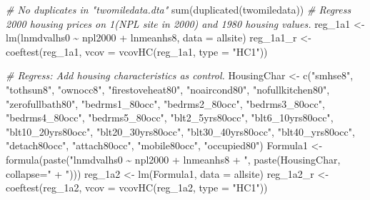 \documentclass[
]{article}
\newenvironment{Shaded}{\begin{snugshade}}{\end{snugshade}}
\newcommand{\AttributeTok}[1]{\textcolor[rgb]{0.77,0.63,0.00}{#1}}
\newcommand{\CommentTok}[1]{\textcolor[rgb]{0.56,0.35,0.01}{\textit{#1}}}
\newcommand{\FunctionTok}[1]{\textcolor[rgb]{0.00,0.00,0.00}{#1}}
\newcommand{\NormalTok}[1]{#1}
\newcommand{\OtherTok}[1]{\textcolor[rgb]{0.56,0.35,0.01}{#1}}
\newcommand{\SpecialCharTok}[1]{\textcolor[rgb]{0.00,0.00,0.00}{#1}}
\newcommand{\StringTok}[1]{\textcolor[rgb]{0.31,0.60,0.02}{#1}}
\begin{document}
\begin{Shaded}
\begin{Highlighting}[]
\CommentTok{\# No duplicates in "twomiledata.dta"}
\FunctionTok{sum}\NormalTok{(}\FunctionTok{duplicated}\NormalTok{(twomiledata))}
\CommentTok{\# Regress 2000 housing prices on 1(NPL site in 2000) and 1980 housing values.}
\NormalTok{reg\_1a1 }\OtherTok{\textless{}{-}} \FunctionTok{lm}\NormalTok{(lnmdvalhs0 }\SpecialCharTok{\textasciitilde{}}\NormalTok{ npl2000 }\SpecialCharTok{+}\NormalTok{ lnmeanhs8, }\AttributeTok{data =}\NormalTok{ allsite)}
\NormalTok{reg\_1a1\_r }\OtherTok{\textless{}{-}} \FunctionTok{coeftest}\NormalTok{(reg\_1a1, }\AttributeTok{vcov =} \FunctionTok{vcovHC}\NormalTok{(reg\_1a1, }\AttributeTok{type =} \StringTok{"HC1"}\NormalTok{))}

\CommentTok{\# Regress: Add housing characteristics as control.}
\NormalTok{HousingChar }\OtherTok{\textless{}{-}} \FunctionTok{c}\NormalTok{(}\StringTok{"smhse8"}\NormalTok{, }\StringTok{"tothsun8"}\NormalTok{, }\StringTok{"ownocc8"}\NormalTok{, }\StringTok{"firestoveheat80"}\NormalTok{, }\StringTok{"noaircond80"}\NormalTok{, }
                 \StringTok{"nofullkitchen80"}\NormalTok{, }\StringTok{"zerofullbath80"}\NormalTok{, }
                \StringTok{"bedrms1\_80occ"}\NormalTok{, }\StringTok{"bedrms2\_80occ"}\NormalTok{, }\StringTok{"bedrms3\_80occ"}\NormalTok{, }\StringTok{"bedrms4\_80occ"}\NormalTok{, }\StringTok{"bedrms5\_80occ"}\NormalTok{,}
                \StringTok{"blt2\_5yrs80occ"}\NormalTok{, }\StringTok{"blt6\_10yrs80occ"}\NormalTok{, }\StringTok{"blt10\_20yrs80occ"}\NormalTok{, }\StringTok{"blt20\_30yrs80occ"}\NormalTok{, }\StringTok{"blt30\_40yrs80occ"}\NormalTok{, }\StringTok{"blt40\_yrs80occ"}\NormalTok{,}
                \StringTok{"detach80occ"}\NormalTok{, }\StringTok{"attach80occ"}\NormalTok{, }\StringTok{"mobile80occ"}\NormalTok{, }\StringTok{"occupied80"}\NormalTok{)}
\NormalTok{Formula1 }\OtherTok{\textless{}{-}} \FunctionTok{formula}\NormalTok{(}\FunctionTok{paste}\NormalTok{(}\StringTok{"lnmdvalhs0 \textasciitilde{} npl2000 + lnmeanhs8 + "}\NormalTok{, }\FunctionTok{paste}\NormalTok{(HousingChar, }\AttributeTok{collapse=}\StringTok{" + "}\NormalTok{)))}
\NormalTok{reg\_1a2 }\OtherTok{\textless{}{-}} \FunctionTok{lm}\NormalTok{(Formula1, }\AttributeTok{data =}\NormalTok{ allsite)}
\NormalTok{reg\_1a2\_r }\OtherTok{\textless{}{-}} \FunctionTok{coeftest}\NormalTok{(reg\_1a2, }\AttributeTok{vcov =} \FunctionTok{vcovHC}\NormalTok{(reg\_1a2, }\AttributeTok{type =} \StringTok{"HC1"}\NormalTok{))}


\end{Highlighting}
\end{Shaded}
\end{document}
